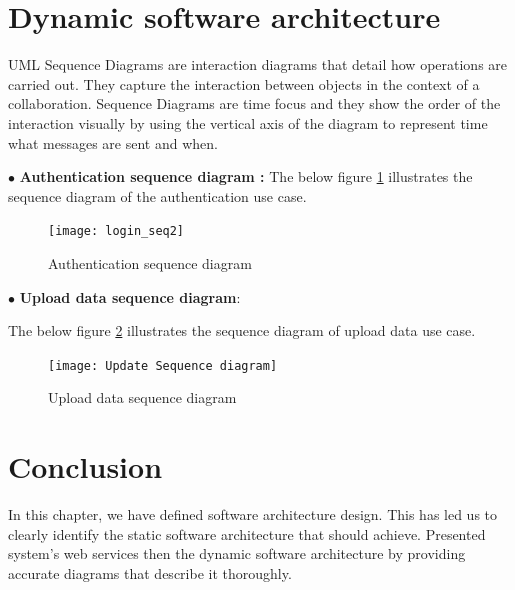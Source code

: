 \section{Dynamic software architecture}
UML Sequence Diagrams are interaction diagrams that detail how operations are carried out. They capture the interaction between objects in the context of a collaboration. Sequence Diagrams are time focus and they show the order of the interaction visually by using the vertical axis of the diagram to represent time what messages are sent and when.

$\bullet$ \textbf{Authentication sequence diagram :}
The below figure  \hyperref[fig:login_seq]{\ref{fig:login_seq}} illustrates the sequence diagram of the authentication use case.


\begin{figure}[!htbp]
\center
\hspace*{-0.5in}
\texttt{[image: login\_seq2]}
  \caption{Authentication sequence diagram}
  \label{fig:login_seq}
\end{figure}


$\bullet$ \textbf{Upload data sequence diagram}: 

The below figure  \hyperref[fig:u_seq]{\ref{fig:u_seq}} illustrates the sequence diagram of upload data use case.


\begin{figure}[!htbp]
\center
\hspace*{-0.5in}
\texttt{[image: Update Sequence diagram]}
  \caption{Upload data sequence diagram}
  \label{fig:u_seq}
\end{figure}

\section*{Conclusion}
In this chapter, we have defined software architecture design. 
This has led us to clearly identify the static software architecture that should achieve.
Presented system's web services then the dynamic software architecture by providing accurate diagrams that describe it thoroughly.
